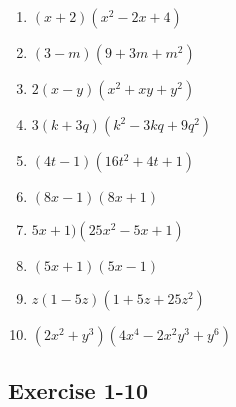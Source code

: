 \begin{multicols}{2}
\begin{enumerate}[itemsep=5pt, label=\textbf{\arabic*}. ] 
\item $(x + 2)(x^2 - 2x + 4)$%
\item $(3 - m)(9 + 3m + m^2)$%
\item $2(x - y)(x^2 + xy + y^2)$%
\item $3(k + 3q)(k^2 - 3kq + 9q^2)$%
\item $(4t - 1)(16t^2 + 4t + 1)$%
\item $(8x - 1)(8x + 1)$%
\item $5x + 1)(25x^2 - 5x + 1)$%
\item $(5x + 1)(5x - 1)$%
\item $z(1 - 5z)(1 + 5z + 25z^2)$%
\item $(2x^2 + y^3)(4x^4 - 2x^2y^3 + y^6)$%
\end{enumerate}
\end{multicols}


\subsection{Exercise 1-10} %

